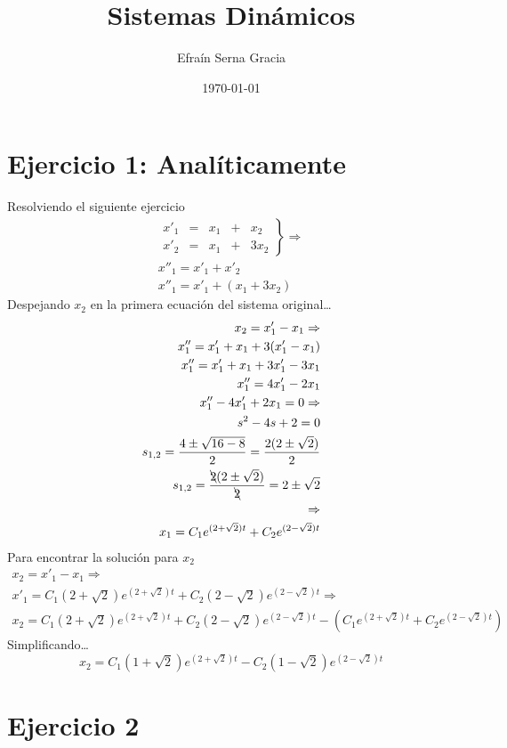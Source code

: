 \documentclass[12pt,spanish,lettersize]{article}
\title{\color{Maroon}Sistemas Din\'amicos}
\author{Efra\'in Serna Gracia}
\date{\color{gray}\today}
\begin{document}
\maketitle
\section{Ejercicio 1: Anal\'iticamente}
Resolviendo el siguiente ejercicio
\begin{eqnarray}
\left.
\begin{array}{lcrcr}
x'_1 & = & x_1 & + & x_2\\
x'_2 & = & x_1 & + & 3x_2
\end{array}
\right\} \Rightarrow\\
x''_1=x'_1+x'_2\\
x''_1=x'_1+(x_1+3x_2)
\end{eqnarray}
Despejando $x_2$ en la primera ecuaci\'on del sistema original\dots
\begin{eqnarray}
x_2=x'_1-x_1 \Rightarrow\\
x''_1=x'_1+x_1+3(x'_1-x_1)\\
x''_1=x'_1+x_1+3x'_1-3x_1\\
x''_1=4x'_1-2x_1\\
x''_1-4x'_1+2x_1=0 \Rightarrow\\
s^2-4s+2=0\\
\nonumber s_{1,2}=\frac{4\pm\sqrt{16-8}}{2}=\frac{2(2\pm\sqrt{2})}{2}\\
\nonumber s_{1,2}=\frac{\bcancel{2}(2\pm\sqrt{2})}{\bcancel{2}}=2\pm\sqrt{2}\\
\nonumber\Rightarrow\\
x_1=C_1e^{(2+\sqrt{2})t}+C_2e^{(2-\sqrt{2})t}
\end{eqnarray}
Para encontrar la soluci\'on para $x_2$
\begin{eqnarray}
\nonumber x_2=x'_1-x_1\Rightarrow\\
x'_1=C_1(2+\sqrt{2})e^{(2+\sqrt{2})t}+C_2(2-\sqrt{2})e^{(2-\sqrt{2})t} \Rightarrow\\
x_2=C_1(2+\sqrt{2})e^{(2+\sqrt{2})t}+C_2(2-\sqrt{2})e^{(2-\sqrt{2})t}-(C_1e^{(2+\sqrt{2})t}+C_2e^{(2-\sqrt{2})t})
\end{eqnarray}
Simplificando\dots
\begin{equation}
x_2=C_1(1+\sqrt{2})e^{(2+\sqrt{2})t}-C_2(1-\sqrt{2})e^{(2-\sqrt{2})t}
\end{equation}
\section{Ejercicio 2}
\end{document}

